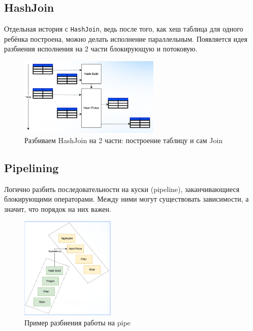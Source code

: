 \documentclass[11pt]{article}
\begin{document}
    \subsection{HashJoin}

    Отдельная история с \texttt{HashJoin}, ведь после того, как хеш таблица для одного ребёнка построена, можно делать исполнение параллельным.
    Появляется идея разбиения исполнения на 2 части блокирующую и потоковую.

    \begin{figure}[h!]
        \centering
        \includegraphics[width=0.6\textwidth]{Pictures/Push/Operators/HashJoin}
        \caption{Разбиваем HashJoin на 2 части: построение таблицу и сам Join}
    \end{figure}

    \subsection{Pipelining}

    Логично разбить последовательности на куски (pipeline), заканчивающиеся блокирующими операторами.
    Между ними могут существовать зависимости, а значит, что порядок на них важен.

    \begin{figure}[h!]
        \centering
        \includegraphics[width=0.4\textwidth]{Pictures/Push/Operators/Pipelining}
        \caption{Пример разбиения работы на pipe}
    \end{figure}
\end{document}

